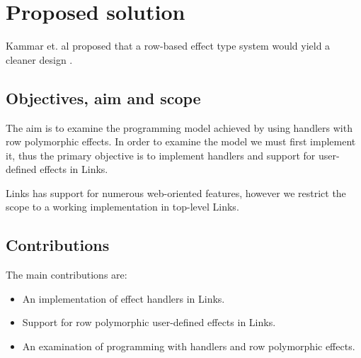 \section{Proposed solution}\label{sec:proposedsolution}
Kammar et. al proposed that a row-based effect type system would yield a cleaner design \cite{Kammar2013}.

\subsection{Objectives, aim and scope}
The aim is to examine the programming model achieved by using handlers with row polymorphic effects.
In order to examine the model we must first implement it, thus the primary objective is to implement handlers and support for user-defined effects in Links.

Links has support for numerous web-oriented features, however we restrict the scope to a working implementation in top-level Links.

\subsection{Contributions}
The main contributions are:
\begin{itemize}
  \item An implementation of effect handlers in Links.
  \item Support for row polymorphic user-defined effects in Links.
  \item An examination of programming with handlers and row polymorphic effects.
\end{itemize}